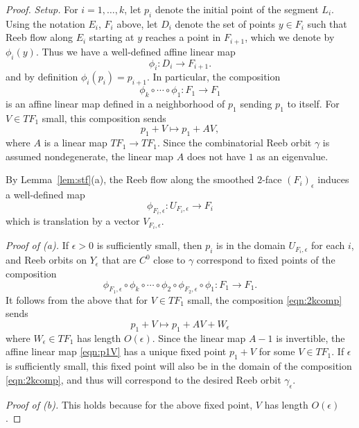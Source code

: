 \begin{proof}
{\em Setup.\/} For $i=1,\ldots,k$, let $p_i$ denote the initial point of the segment $L_i$. Using the notation $E_i$, $F_i$ above, let $D_i$ denote the set of points $y\in F_i$ such that Reeb flow along $E_i$ starting at $y$ reaches a point in $F_{i+1}$, which we denote by $\phi_i(y)$. Thus we have a well-defined affine linear map
\[
\phi_i:D_i\longrightarrow F_{i+1}.
\]
and by definition $\phi_i(p_i) = p_{i+1}$. In particular, the composition
\[
\phi_k\circ\cdots\circ \phi_1: F_1 \longrightarrow F_1
\]
is an affine linear map defined in a neighborhood of $p_1$ sending $p_1$ to itself. For $V\in TF_1$ small, this composition sends
\[
p_1 + V \longmapsto p_1 + AV,
\]
where $A$ is a linear map $TF_1\to TF_1$. Since the combinatorial Reeb orbit $\gamma$ is assumed nondegenerate, the linear map $A$ does not have $1$ as an eigenvalue.

By Lemma~\ref{lem:stf}(a), the Reeb flow along the smoothed $2$-face $(F_i)_{\epsilon}$ induces a well-defined map
\begin{equation}
\label{eqn:stf}
\phi_{F_i,\epsilon}: U_{F_i,\epsilon} \longrightarrow F_i
\end{equation}
which is translation by a vector $V_{F_i,\epsilon}$.

{\em Proof of (a).\/} If $\epsilon>0$ is sufficiently small, then $p_i$ is in the domain $U_{F_i,\epsilon}$ for each $i$, and Reeb orbits on $Y_\epsilon$ that are $C^0$ close to $\gamma$ correspond to fixed points of the composition
\begin{equation}
\label{eqn:2kcomp}
\phi_{F_1,\epsilon} \circ \phi_k \circ \cdots \circ \phi_2 \circ \phi_{F_2,\epsilon} \circ \phi_1 : F_1 \longrightarrow F_1.
\end{equation}
It follows from the above that for $V\in TF_1$ small, the composition \eqref{eqn:2kcomp} sends
\begin{equation}
\label{eqn:p1V}
p_1 + V \longmapsto p_1 + AV + W_\epsilon
\end{equation}
where $W_\epsilon\in TF_1$ has length $O(\epsilon)$. Since the linear map $A-1$ is invertible, the affine linear map \eqref{eqn:p1V} has a unique fixed point $p_1+V$ for some $V\in TF_1$. If $\epsilon$ is sufficiently small, this fixed point will also be in the domain of the composition \eqref{eqn:2kcomp}, and thus will correspond to the desired Reeb orbit $\gamma_\epsilon$.

{\em Proof of (b).\/} This holds because for the above fixed point, $V$ has length $O(\epsilon)$.


\end{proof}
